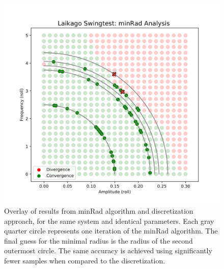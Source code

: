     \begin{figure}[hb!]
    \centering
    \includegraphics[width=.5\linewidth]{figures/minrad_analysis_v2.png}
    \caption[minRad Result Analysis]{Overlay of results from minRad algorithm and discretization approach, for the same system and identical parameters. Each gray quarter circle represents one iteration of the minRad algorithm. The final guess for the minimal radius is the radius of the second outermost circle. The same accuracy is achieved using significantly fewer samples when compared to the discretization.}
    \label{fig:minradanal}
    \end{figure}

